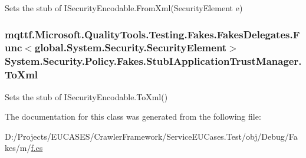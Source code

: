 Sets the stub of I\-Security\-Encodable.\-From\-Xml(\-Security\-Element e)

\hypertarget{class_system_1_1_security_1_1_policy_1_1_fakes_1_1_stub_i_application_trust_manager_ae8180d3c9523ad5168869cf38453a032}{
\subsubsection[{To\-Xml}]{\setlength{\rightskip}{0pt plus 5cm}mqttf.\-Microsoft.\-Quality\-Tools.\-Testing.\-Fakes.\-Fakes\-Delegates.\-Func$<$global.\-System.\-Security.\-Security\-Element$>$ System.\-Security.\-Policy.\-Fakes.\-Stub\-I\-Application\-Trust\-Manager.\-To\-Xml}}\label{class_system_1_1_security_1_1_policy_1_1_fakes_1_1_stub_i_application_trust_manager_ae8180d3c9523ad5168869cf38453a032}


Sets the stub of I\-Security\-Encodable.\-To\-Xml()



The documentation for this class was generated from the following file\-:\begin{DoxyCompactItemize}
\item 
D\-:/\-Projects/\-E\-U\-C\-A\-S\-E\-S/\-Crawler\-Framework/\-Service\-E\-U\-Cases.\-Test/obj/\-Debug/\-Fakes/m/\hyperlink{m_2f_8cs}{f.\-cs}\end{DoxyCompactItemize}
